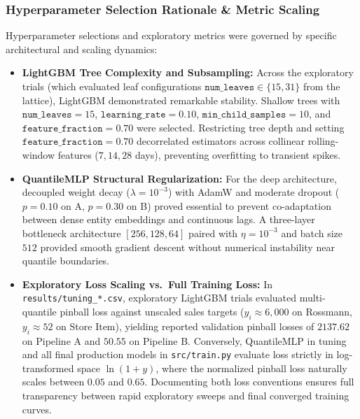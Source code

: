 \documentclass[11pt,a4paper]{article}
\begin{document}
\subsubsection{Hyperparameter Selection Rationale \& Metric Scaling}
Hyperparameter selections and exploratory metrics were governed by specific architectural and scaling dynamics:
\begin{itemize}
    \item \textbf{LightGBM Tree Complexity and Subsampling:} Across the exploratory trials (which evaluated leaf configurations $\texttt{num\_leaves} \in \{15, 31\}$ from the lattice), LightGBM demonstrated remarkable stability. Shallow trees with $\texttt{num\_leaves} = 15$, $\texttt{learning\_rate} = 0.10$, $\texttt{min\_child\_samples} = 10$, and $\texttt{feature\_fraction} = 0.70$ were selected. Restricting tree depth and setting $\texttt{feature\_fraction} = 0.70$ decorrelated estimators across collinear rolling-window features ($7, 14, 28$ days), preventing overfitting to transient spikes.
    \item \textbf{QuantileMLP Structural Regularization:} For the deep architecture, decoupled weight decay ($\lambda = 10^{-3}$) with AdamW and moderate dropout ($p = 0.10$ on A, $p = 0.30$ on B) proved essential to prevent co-adaptation between dense entity embeddings and continuous lags. A three-layer bottleneck architecture $[256, 128, 64]$ paired with $\eta = 10^{-3}$ and batch size $512$ provided smooth gradient descent without numerical instability near quantile boundaries.
    \item \textbf{Exploratory Loss Scaling vs.\ Full Training Loss:} In \texttt{results/tuning\_*.csv}, exploratory LightGBM trials evaluated multi-quantile pinball loss against unscaled sales targets ($y_i \approx 6,000$ on Rossmann, $y_i \approx 52$ on Store Item), yielding reported validation pinball losses of $2137.62$ on Pipeline A and $50.55$ on Pipeline B. Conversely, QuantileMLP in tuning and all final production models in \texttt{src/train.py} evaluate loss strictly in log-transformed space $\ln(1+y)$, where the normalized pinball loss naturally scales between $0.05$ and $0.65$. Documenting both loss conventions ensures full transparency between rapid exploratory sweeps and final converged training curves.
\end{itemize}
\end{document}
